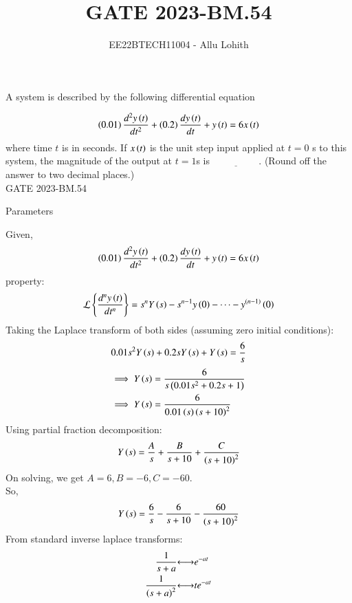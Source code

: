 \documentclass[journal,12pt,twocolumn]{IEEEtran}
\theoremstyle{remark}
\begin{document}

\vspace{3cm}

\title{GATE 2023-BM.54}
\author{EE22BTECH11004 - Allu Lohith}

\maketitle

    A system is described by the following differential equation
    
    $$\left(0.01\right) \frac{d^2y\left(t\right)}{dt^2} + \left(0.2\right)\frac{dy\left(t\right) }{dt} + y\left(t\right) = 6x\left(t\right)$$
    where time $t$ is in seconds. If $x\left(t\right)$ is the unit step input applied at $t = 0$ s to this system, the magnitude of the output at $t = 1$s is $\underline{\hspace{2cm}}$. (Round off the answer to two decimal places.)\\

    \hfill {GATE 2023-BM.54}
    
\solution
\fi
\begin{table}[h!]
\centering

\vspace{0.5cm}
\caption{\normalsize Parameters}
\end{table}
    Given,
    \begin{align}
         \left(0.01\right) \frac{d^2y\left(t\right)}{dt^2} + \left(0.2\right)\frac{dy\left(t\right) }{dt} + y\left(t\right) = 6x\left(t\right)
    \end{align}
    property:
    \begin{align}
        \mathcal{L}\left\{\frac{d^n y\left(t\right)}{dt^n}\right\} = s^n Y\left(s\right) - s^{n-1} y\left(0\right) - \dots - y^{\left(n-1\right)}\left(0\right)
    \end{align}
    Taking the Laplace transform of both sides (assuming zero initial conditions):
   \begin{align}
        0.01s^2Y\left(s\right) + 0.2sY\left(s\right) + Y\left(s\right) = \frac{6}{s}
    \end{align}
    \begin{align}
        \implies Y\left(s\right) &= \frac{6}{s\left(0.01s^2 + 0.2s + 1\right)}\\
        \implies Y\left(s\right) &= \frac{6}{ 0.01\left(s\right) \left(s + 10\right)^2}
    \end{align}
    Using partial fraction decomposition:
    \begin{align}
    Y\left(s\right) = \frac{A}{s} + \frac{B}{s + 10} + \frac{C}{\left(s + 10\right)^2}
    \end{align}
    On solving, we get $A=6,B=-6,C=-60$.\\
    So,\begin{align}
        Y\left(s\right) = \frac{6}{s} - \frac{6}{s + 10} - \frac{60}{\left(s + 10\right)^2}
    \end{align}
    From standard inverse laplace transforms:
    \begin{align}
	    \frac{1}{s+a}   &{\longleftrightarrow}    e^{-at}\\
	    \frac{1}{\left(s+a\right)^2}  &{\longleftrightarrow }  te^{-at}
    \end{align}	    
	    
\end{document}
